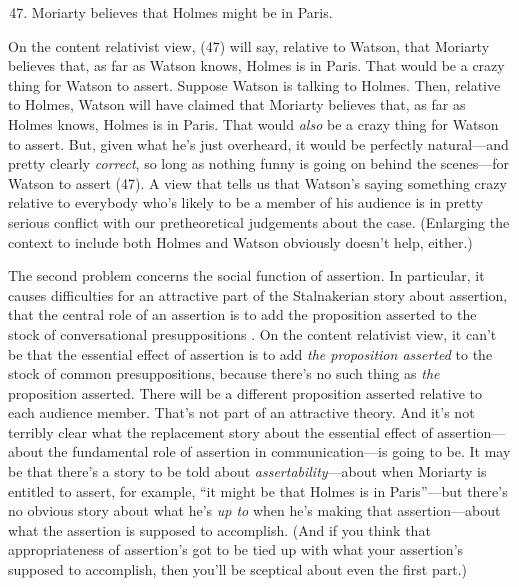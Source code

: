 \begin{enumerate}
\setcounter{enumi}{46} 
\item Moriarty believes that Holmes might be in Paris.
\end{enumerate}

\noindent On the content relativist view, (47) will say, relative to Watson, that Moriarty believes that, as far as Watson knows, Holmes is in Paris. That would be a crazy thing for Watson to assert. Suppose Watson is talking to Holmes. Then, relative to Holmes, Watson will have claimed that Moriarty believes that, as far as Holmes knows, Holmes is in Paris. That would \textit{also} be a crazy thing for Watson to assert. But, given what he's just overheard, it would be perfectly natural---and pretty clearly \textit{correct}, so long as nothing funny is going on behind the scenes---for Watson to assert (47). A view that tells us that Watson's saying something crazy relative to everybody who's likely to be a member of his audience is in pretty serious conflict with our pretheoretical judgements about the case. (Enlarging the context to include both Holmes and Watson obviously doesn't help, either.)
 
The second problem concerns the social function of assertion. In particular, it causes difficulties for an attractive part of the Stalnakerian story about assertion, that the central role of an assertion is to add the proposition asserted to the stock of conversational presuppositions \citep{Stalnaker1978}. On the content relativist view, it can't be that the essential effect of assertion is to add \textit{the proposition asserted} to the stock of common presuppositions, because there's no such thing as \textit{the }proposition asserted. There will be a different proposition asserted relative to each audience member. That's not part of an attractive theory. And it's not terribly clear what the replacement story about the essential effect of assertion---about the fundamental role of assertion in communication---is going to be. It may be that there's a story to be told about \textit{assertability}{}---about when Moriarty is entitled to assert, for example, ``it might be that Holmes is in Paris''---but there's no obvious story about what he's \textit{up to} when he's making that assertion---about what the assertion is supposed to accomplish. (And if you think that appropriateness of assertion's got to be tied up with what your assertion's supposed to accomplish, then you'll be sceptical about even the first part.)
 
